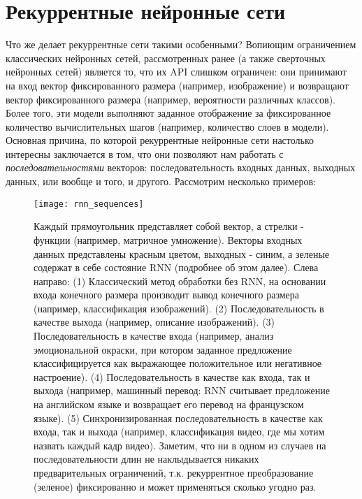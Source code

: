 \section{Рекуррентные нейронные сети}

Что же делает рекуррентные сети такими особенными? Вопиющим 
ограничением классических нейронных сетей, рассмотренных ранее 
(а также сверточных нейронных сетей) 
является то, что их API слишком ограничен: 
они принимают на вход вектор фиксированного размера (например, изображение) 
и возвращают вектор фиксированного размера (например, вероятности 
различных классов). Более того, эти модели выполняют заданное отображение за 
фиксированное количество вычислительных шагов (например, количество слоев в модели). 
Основная причина, по которой рекуррентные нейронные сети настолько интересны 
заключается в том, что они позволяют нам работать с \textit{последовательностями} 
векторов: последовательность входных данных, выходных данных, или вообще и того, 
и другого. Рассмотрим несколько примеров:

\begin{figure}[h!]
    \centering
    \texttt{[image: rnn\_sequences]}
    \caption{Каждый прямоугольник представляет собой вектор, а стрелки - функции (например, 
    матричное умножение). Векторы входных данных представлены красным цветом, выходных - синим, 
    а зеленые содержат в себе состояние RNN (подробнее об этом далее). Слева направо: 
    (1) Классический метод обработки без RNN, на основании входа конечного размера производит 
    вывод конечного размера (например, классификация изображений). (2) Последовательность 
    в качестве выхода (например, описание изображений). (3) Последовательность в качестве входа 
    (например, анализ эмоциональной окраски, при котором заданное предложение 
    классифицируется как выражающее положительное или негативное настроение). (4) 
    Последовательность в качестве как входа, так и выхода (например, машинный перевод: 
    RNN считывает предложение на английском языке и возвращает его перевод на 
    французском языке). (5) Синхронизированная последовательность в качестве как входа, 
    так и выхода (например, классификация видео, где мы хотим назвать каждый кадр видео). 
    Заметим, что ни в одном из случаев на последовательности длин не наклыдывается 
    никаких предварительных ограничений, т.к. рекуррентное преобразование (зеленое) 
    фиксированно и может применяться сколько угодно раз.}
    \label{fig:rnn_sequences}
\end{figure}

